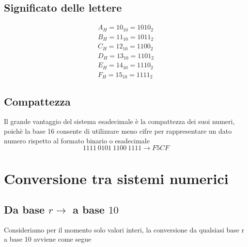 \subsection{Significato delle lettere}
{
    \LARGE
    \begin{gather*}
    A_H = 10_{10} = 1010_2 \\
    B_H = 11_{10} = 1011_2 \\
    C_H = 12_{10} = 1100_2 \\
    D_H = 13_{10} = 1101_2 \\
    E_H = 14_{10} = 1110_2 \\
    F_H = 15_{10} = 1111_2
\end{gather*}
}

\subsection{Compattezza}
Il grande vantaggio del sistema esadecimale è la compattezza dei suoi numeri, poichè la base 16 consente di utilizzare meno cifre per rappresentare un dato numero rispetto al formato binario o esadecimale
{\large
    $$
        1111\ 0101\ 1100\ 1111 \rightarrow F5CF
    $$
}

\section{Conversione tra sistemi numerici}
\subsection{Da base $r \rightarrow$ a base $10$ }
Consideriamo per il momento solo valori interi, la conversione da qualsiasi base r a base 10 avviene come segue

